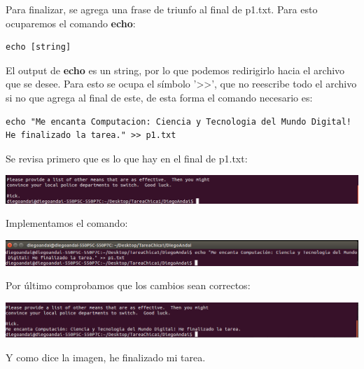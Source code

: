 \documentclass[a4paper,11pt]{article}
\theoremstyle{mytheor}
\begin{document}
Para finalizar, se agrega una frase de triunfo al final de p1.txt. Para esto ocuparemos el comando \textbf{echo}:

\begin{lstlisting}
echo [string]
\end{lstlisting}

El output de \textbf{echo} es un string, por lo que podemos redirigirlo hacia el archivo que se desee. Para esto se ocupa el símbolo '>>', que no reescribe todo el archivo si no que agrega al final de este, de esta forma el comando necesario es: 

\begin{lstlisting}
echo "Me encanta Computacion: Ciencia y Tecnologia del Mundo Digital! He finalizado la tarea." >> p1.txt
\end{lstlisting}

Se revisa primero que es lo que hay en el final de p1.txt:

\begin{center}
\includegraphics[scale=0.385]{tc1_paso10(1).png}
\end{center}

Implementamos el comando:

\begin{center}
\includegraphics[scale=0.385]{tc1_paso10(2).png}
\end{center}

Por último comprobamos que los cambios sean correctos:

\begin{center}
\includegraphics[scale=0.385]{tc1_paso10(3).png}
\end{center}

Y como dice la imagen, he finalizado mi tarea.
\end{document}
